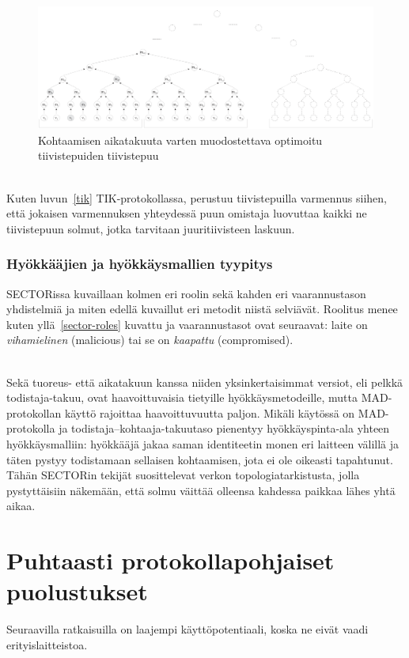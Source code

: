 \documentclass[finnish]{tktltiki2}
\theoremstyle{definition}
\theoremstyle{remark}
\begin{document}
\begin{figure}[h]
  \centering
  \includegraphics[width=\textwidth]{tree-of-trees}
  \caption{Kohtaamisen aikatakuuta varten muodostettava optimoitu tiivistepuiden tiivistepuu \cite{sector}}
  \label{fig:sectortrees}
\end{figure}


\noindent\\
Kuten luvun~\ref{tik} TIK-protokollassa, perustuu tiivistepuilla varmennus siihen, että jokaisen varmennuksen yhteydessä puun omistaja luovuttaa kaikki ne tiivistepuun solmut, jotka tarvitaan juuritiivisteen laskuun.

\subsubsection{Hyökkääjien ja hyökkäysmallien tyypitys}

SECTORissa kuvaillaan kolmen eri roolin sekä kahden eri vaarannustason yhdistelmiä ja miten edellä kuvaillut eri metodit niistä selviävät. Roolitus menee kuten yllä~\ref{sector-roles} kuvattu ja vaarannustasot ovat seuraavat: laite on \emph{vihamielinen} (malicious) tai se on \emph{kaapattu} (compromised).

\noindent\\
Sekä tuoreus- että aikatakuun kanssa niiden yksinkertaisimmat versiot, eli pelkkä todistaja-takuu, ovat haavoittuvaisia tietyille hyökkäysmetodeille, mutta MAD-protokollan käyttö rajoittaa haavoittuvuutta paljon. Mikäli käytössä on MAD-protokolla ja todistaja--kohtaaja-takuutaso pienentyy hyökkäyspinta-ala yhteen hyökkäysmalliin: hyökkääjä jakaa saman identiteetin monen eri laitteen välillä ja täten pystyy todistamaan sellaisen kohtaamisen, jota ei ole oikeasti tapahtunut. Tähän SECTORin tekijät suosittelevat verkon topologiatarkistusta, jolla pystyttäisiin näkemään, että solmu väittää olleensa kahdessa paikkaa lähes yhtä aikaa.


\section{Puhtaasti protokollapohjaiset puolustukset}
Seuraavilla ratkaisuilla on laajempi käyttöpotentiaali, koska ne eivät vaadi erityislaitteistoa.
\end{document}
